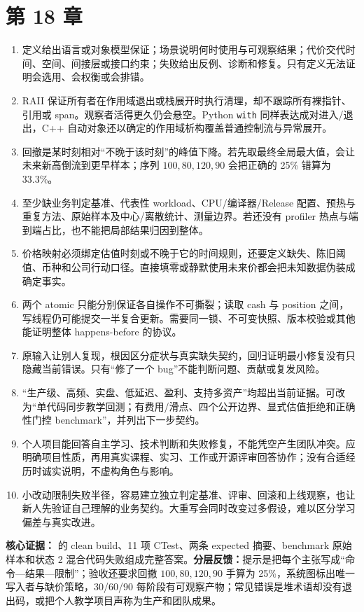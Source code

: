 \section{第 18 章}
\begin{enumerate}
  \item 定义给出语言或对象模型保证；场景说明何时使用与可观察结果；代价交代时间、空间、间接层或接口约束；失败给出反例、诊断和修复。只有定义无法证明会选用、会权衡或会排错。
  \item RAII 保证所有者在作用域退出或栈展开时执行清理，却不跟踪所有裸指针、引用或 span。观察者活得更久仍会悬空。Python \texttt{with} 同样表达成对进入/退出，C++ 自动对象还以确定的作用域析构覆盖普通控制流与异常展开。
  \item 回撤是某时刻相对“不晚于该时刻”的峰值下降。若先取最终全局最大值，会让未来新高倒流到更早样本；序列 \(100,80,120,90\) 会把正确的 25\% 错算为 33.3\%。
  \item 至少缺业务判定基准、代表性 workload、CPU/编译器/Release 配置、预热与重复方法、原始样本及中心/离散统计、测量边界。若还没有 profiler 热点与端到端占比，也不能把局部结果归因到整体。
  \item 价格映射必须绑定估值时刻或不晚于它的时间规则，还要定义缺失、陈旧阈值、币种和公司行动口径。直接填零或静默使用未来价都会把未知数据伪装成确定事实。
  \item 两个 atomic 只能分别保证各自操作不可撕裂；读取 cash 与 position 之间，写线程仍可能提交一半复合更新。需要同一锁、不可变快照、版本校验或其他能证明整体 happens-before 的协议。
  \item 原输入让别人复现，根因区分症状与真实缺失契约，回归证明最小修复没有只隐藏当前错误。只有“修了一个 bug”不能判断问题、贡献或复发风险。
  \item “生产级、高频、实盘、低延迟、盈利、支持多资产”均超出当前证据。可改为“单代码同步教学回测；有费用/滑点、四个公开边界、显式估值拒绝和正确性门控 benchmark”，并列出下一步契约。
  \item 个人项目能回答自主学习、技术判断和失败修复，不能凭空产生团队冲突。应明确项目性质，再用真实课程、实习、工作或开源评审回答协作；没有合适经历时诚实说明，不虚构角色与影响。
  \item 小改动限制失败半径，容易建立独立判定基准、评审、回滚和上线观察，也让新人先验证自己理解的业务契约。大重写会同时改变过多假设，难以区分学习偏差与真实改进。
\end{enumerate}

\noindent\textbf{核心证据：} 的 clean build、11 项 CTest、两条 expected 摘要、benchmark 原始样本和状态 2 混合代码失败组成完整答案。\textbf{分层反馈：}提示是把每个主张写成“命令—结果—限制”；验收还要求回撤 \(100,80,120,90\) 手算为 25\%，系统图标出唯一写入者与缺价策略，30/60/90 每阶段有可观察产物；常见错误是堆术语却没有退出码，或把个人教学项目声称为生产和团队成果。
